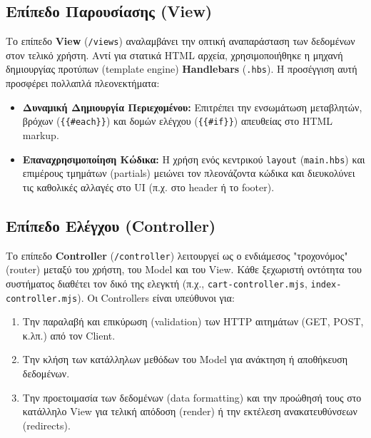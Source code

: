 \documentclass[acmsmall,screen,nonacm]{acmart}
\begin{document}
	\subsection{Επίπεδο Παρουσίασης (View)}
	Το επίπεδο \textbf{View} (\texttt{/views}) αναλαμβάνει την οπτική αναπαράσταση των δεδομένων στον τελικό χρήστη.
	Αντί για στατικά HTML αρχεία, χρησιμοποιήθηκε η μηχανή δημιουργίας προτύπων (template engine) \textbf{Handlebars} (\texttt{.hbs}). Η προσέγγιση αυτή προσφέρει πολλαπλά πλεονεκτήματα:
	\begin{itemize}
		\item \textbf{Δυναμική Δημιουργία Περιεχομένου:} Επιτρέπει την ενσωμάτωση μεταβλητών, βρόχων (\texttt{\{\{\#each\}\}}) και δομών ελέγχου (\texttt{\{\{\#if\}\}}) απευθείας στο HTML markup.
		\item \textbf{Επαναχρησιμοποίηση Κώδικα:} Η χρήση ενός κεντρικού \texttt{layout} (\texttt{main.hbs}) και επιμέρους τμημάτων (partials) μειώνει τον πλεονάζοντα κώδικα και διευκολύνει τις καθολικές αλλαγές στο UI (π.χ. στο header ή το footer).
	\end{itemize}

	\subsection{Επίπεδο Ελέγχου (Controller)}
	Το επίπεδο \textbf{Controller} (\texttt{/controller}) λειτουργεί ως ο ενδιάμεσος "τροχονόμος" (router) μεταξύ του χρήστη, του Model και του View. 
	Κάθε ξεχωριστή οντότητα του συστήματος διαθέτει τον δικό της ελεγκτή (π.χ., \texttt{cart-controller.mjs}, \texttt{index-controller.mjs}). Οι Controllers είναι υπεύθυνοι για:
	\begin{enumerate}
		\item Την παραλαβή και επικύρωση (validation) των HTTP αιτημάτων (GET, POST, κ.λπ.) από τον Client.
		\item Την κλήση των κατάλληλων μεθόδων του Model για ανάκτηση ή αποθήκευση δεδομένων.
		\item Την προετοιμασία των δεδομένων (data formatting) και την προώθησή τους στο κατάλληλο View για τελική απόδοση (render) ή την εκτέλεση ανακατευθύνσεων (redirects).
	\end{enumerate}
\end{document}
